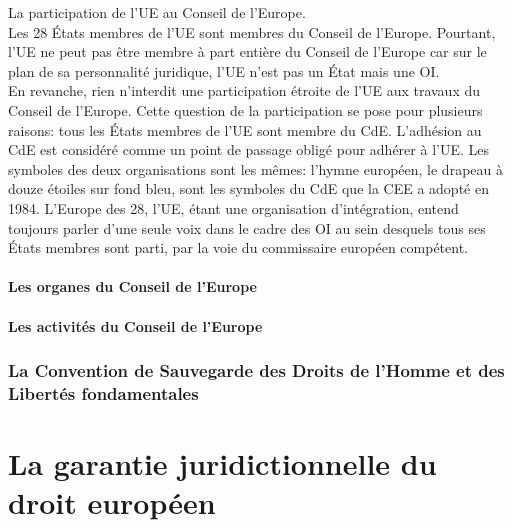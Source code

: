 \documentclass[10pt, a4paper, openany]{book}
\begin{document}
La participation de l'UE au Conseil de l'Europe. \\
Les 28 États membres de l'UE sont membres du Conseil de l'Europe. Pourtant, l'UE ne peut pas être membre à part entière du Conseil de l'Europe car sur le plan de sa personnalité juridique, l'UE n'est pas un État mais une OI. \\
En revanche, rien n'interdit une participation étroite de l'UE aux travaux du Conseil de l'Europe. Cette question de la participation se pose pour plusieurs raisons: tous les États membres de l'UE sont membre du CdE. L'adhésion au CdE est considéré comme un point de passage obligé pour adhérer à l'UE. Les symboles des deux organisations sont les mêmes: l'hymne européen, le drapeau à douze étoiles sur fond bleu, sont les symboles du CdE que la CEE a adopté en 1984. L'Europe des 28, l'UE, étant une organisation d'intégration, entend toujours parler d'une seule voix dans le cadre des OI au sein desquels tous ses États membres sont parti, par la voie du commissaire européen compétent. 






















\subsection{Les organes du Conseil de l'Europe}

\subsection{Les activités du Conseil de l'Europe}




\section{La Convention de Sauvegarde des Droits de l'Homme et des Libertés fondamentales}


\part{La garantie juridictionnelle du droit européen}
\end{document}

